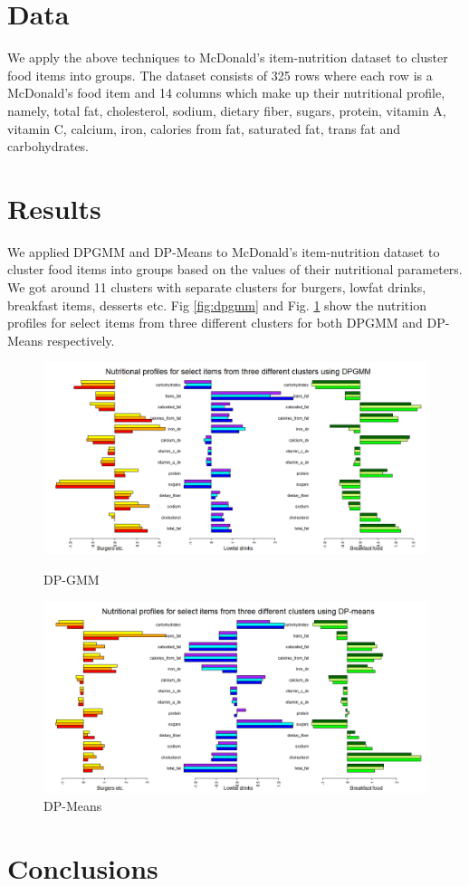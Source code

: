 \documentclass{article} %
\begin{document}
\section{Data}
We apply the above techniques to McDonald's item-nutrition dataset to cluster food items into groups. The dataset consists of 325 rows where each row is a McDonald's food item and 14 columns which make up their nutritional profile, namely, total fat, cholesterol, sodium, dietary fiber, sugars, protein, vitamin A, vitamin C, calcium, iron, calories from fat, saturated fat, trans fat and carbohydrates.

\section{Results}
We applied DPGMM and DP-Means to McDonald’s item-nutrition dataset to cluster food items into groups based on the values of their nutritional parameters. We got around 11 clusters with separate clusters for burgers, lowfat drinks, breakfast items, desserts etc. Fig \ref{fig:dpgmm} and Fig. \ref{fig:dpmeans} show the nutrition profiles for select items from three different clusters for both DPGMM and DP-Means respectively.

\begin{figure}
  \centering
  \includegraphics[width=.6\linewidth]{plots/dpgmm.png}
  \caption{DP-GMM}
  \label{fig:dpgmm}
  \includegraphics[width=.6\linewidth]{plots/dpmeans.png}
  \caption{DP-Means}
  \label{fig:dpmeans}
\end{figure}


\section{Conclusions}
\end{document}
